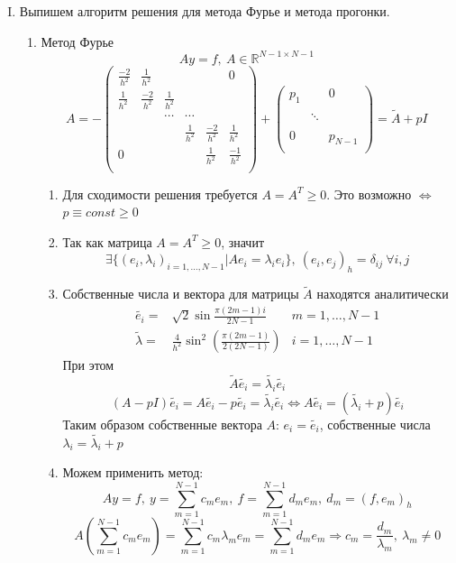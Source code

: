 \documentclass[12pt]{article}
\begin{document}
\begin{enumerate}[I.]
        \item Выпишем алгоритм решения для метода Фурье и метода прогонки.
        \begin{enumerate}
            \item Метод Фурье
            \[Ay=f,\ A\in \mathbb{R}^{N-1\times N-1}\]
            \[A=
            -\left(\begin{array}{cccccc}
                \frac{-2}{h^2}& \frac{1}{h^2}  &&&& 0 \\
                \frac{1}{h^2} & \frac{-2}{h^2} & \frac{1}{h^2} &&& \\
                &&\cdots&\cdots&& \\
                &&& \frac{1}{h^2} & \frac{-2}{h^2} & \frac{1}{h^2} \\
                0 &&&               & \frac{1}{h^2}  & \frac{-1}{h^2} \\
            \end{array}\right)
            +
            \left(\begin{array}{ccc}
                p_1  && 0 \\
                && \\
                &\ddots& \\
                && \\
                0 && p_{N-1} \\
            \end{array}\right)
            =\tilde{A} +pI\]
            \begin{enumerate}
                \item Для сходимости решения требуется $A=A^T\geq0$. Это возможно $\Leftrightarrow$ $p\equiv const\geq0$
                \item Так как матрица $A=A^T\geq0$, значит 
                \[\exists\{(e_i,\lambda_i)_{i=1,\ldots,N-1}|Ae_i=\lambda_ie_i\},\ (e_i,e_j)_h=\delta_{ij}\ \forall i,j \]
                \item Собственные числа и вектора для матрицы $\tilde{A}$ находятся аналитически
                \begin{align*}
                    \tilde{e_i}=&\sqrt{2}\sin\frac{\pi(2m-1)i}{2N-1}  &m=1,\ldots,N-1\\
                    \tilde{\lambda}=&\frac{4}{h^2}\sin^2\left(\frac{\pi(2m-1)}{2(2N-1)}\right) &i=1,\ldots,N-1
                \end{align*}
                При этом
                \[\tilde{A}\tilde{e_i}=\tilde{\lambda_i}\tilde{e_i}\]
                \[(A-pI)\tilde{e_i}=A\tilde{e_i}-p\tilde{e_i}=\tilde{\lambda_i}\tilde{e_i}\Leftrightarrow A\tilde{e_i}=(\tilde{\lambda_i}+p)\tilde{e_i}\]
                Таким образом собственные вектора $A$: $e_i = \tilde{e_i}$, собственные числа $\lambda_i=\tilde{\lambda_i}+p$
                \item Можем применить метод:
                \[Ay=f,\ y=\sum_{m=1}^{N-1}c_me_m,\ f=\sum_{m=1}^{N-1}d_me_m,\ d_m=(f,e_m)_h\]
                \[A\left(\sum_{m=1}^{N-1}c_me_m\right)=\sum_{m=1}^{N-1}c_m\lambda_me_m=\sum_{m=1}^{N-1}d_me_m\Rightarrow c_m=\frac{d_m}{\lambda_m},\ \lambda_m\neq0\]
            \end{enumerate}


\end{enumerate}
\end{enumerate}
\end{document}
